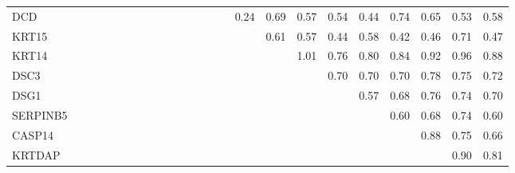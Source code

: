 \begin{longtable}{lrrrrrrrrrrrrrrrrrrrrrrr}
DCD      &            &            &           &            &            &            &              &               &              &             &            &            &            &           &        0.24 &        0.69 &       0.57 &       0.54 &           0.44 &         0.74 &         0.65 &       0.53 &          0.58 \\
KRT15    &            &            &           &            &            &            &              &               &              &             &            &            &            &           &             &        0.61 &       0.57 &       0.44 &           0.58 &         0.42 &         0.46 &       0.71 &          0.47 \\
KRT14    &            &            &           &            &            &            &              &               &              &             &            &            &            &           &             &             &       1.01 &       0.76 &           0.80 &         0.84 &         0.92 &       0.96 &          0.88 \\
DSC3     &            &            &           &            &            &            &              &               &              &             &            &            &            &           &             &             &            &       0.70 &           0.70 &         0.70 &         0.78 &       0.75 &          0.72 \\
DSG1     &            &            &           &            &            &            &              &               &              &             &            &            &            &           &             &             &            &            &           0.57 &         0.68 &         0.76 &       0.74 &          0.70 \\
SERPINB5 &            &            &           &            &            &            &              &               &              &             &            &            &            &           &             &             &            &            &                &         0.60 &         0.68 &       0.74 &          0.60 \\
CASP14   &            &            &           &            &            &            &              &               &              &             &            &            &            &           &             &             &            &            &                &              &         0.88 &       0.75 &          0.66 \\
KRTDAP   &            &            &           &            &            &            &              &               &              &             &            &            &            &           &             &             &            &            &                &              &              &       0.90 &          0.81 \\

\end{longtable}
